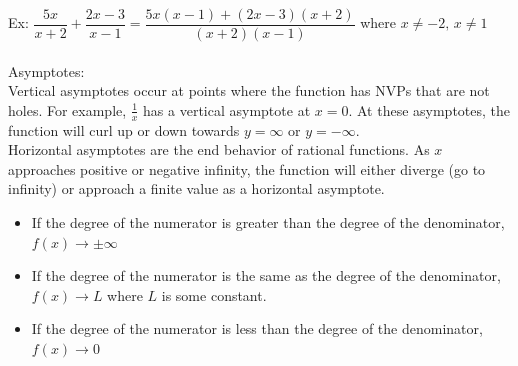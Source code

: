 Ex: $\dfrac{5x}{x+2}+\dfrac{2x-3}{x-1}=\dfrac{5x(x-1)+(2x-3)(x+2)}{(x+2)(x-1)}$ where $x\neq-2,\,x\neq1$\\
\\
Asymptotes:\\
Vertical asymptotes occur at points where the function has NVPs that are not holes. For example, $\frac{1}{x}$ has a vertical asymptote at $x=0$. At these asymptotes, the function will curl up or down towards $y=\infty$ or $y=-\infty$.\\
Horizontal asymptotes are the end behavior of rational functions. As $x$ approaches positive or negative infinity, the function will either diverge (go to infinity) or approach a finite value as a horizontal asymptote.
\begin{itemize}
    \item If the degree of the numerator is greater than the degree of the denominator, $f(x)\to\pm\infty$
    \item If the degree of the numerator is the same as the degree of the denominator, $f(x)\to L$ where $L$ is some constant.
    \item If the degree of the numerator is less than the degree of the denominator, $f(x)\to 0$
\end{itemize}